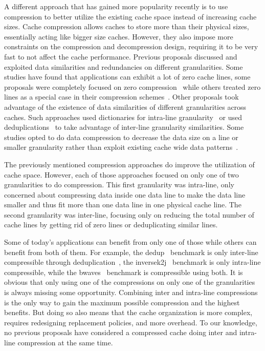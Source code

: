 A different approach that has gained more popularity recently is to use compression to better utilize the existing cache space instead of increasing cache sizes. Cache compression allows caches to store more than their physical sizes, essentially acting like bigger size caches. However, they also impose more constraints on the compression and decompression design, requiring it to be very fast to not affect the cache performance. Previous proposals discussed and exploited data similarities and redundancies on different granularities. Some studies have found that applications can exhibit a lot of zero cache lines, some proposals were completely focused on zero compression~\cite{zca} while others treated zero lines as a special case in their compression schemes~\cite{fpc, hycomp, dedup}. Other proposals took advantage of the existence of data similarities of different granularities across caches. Such approaches used dictionaries for intra-line granularity~\cite{cpack, dish} or used deduplications~\cite{dedup} to take advantage of inter-line granularity similarities. Some studies opted to do data compression to decrease the data size on a line or smaller granularity rather than exploit existing cache wide data patterns~\cite{bdi, sc2, hycomp}.\par
The previously mentioned compression approaches do improve the utilization of cache space. However, each of those approaches focused on only one of two granularities to do compression. This first granularity was intra-line, only concerned about compressing data inside one data line to make the data line smaller and thus fit more than one data line in one physical cache line. The second granularity was inter-line, focusing only on reducing the total number of cache lines by getting rid of zero lines or deduplicating similar lines.\par
Some of today's applications can benefit from only one of those while others can benefit from both of them. For example, the dedup~\cite{parsec} benchmark is only inter-line compressible through deduplication~\cite{dedup}, the inversek2j~\cite{axbench} benchmark is only intra-line compressible, while the bwaves~\cite{spec} benchmark is compressible using both. It is obvious that only using one of the compressions on only one of the granularities is always missing some opportunity. Combining inter and intra-line compressions is the only way to gain the maximum possible compression and the highest benefits. But doing so also means that the cache organization is more complex, requires redesigning replacement policies, and more overhead. To our knowledge, no previous proposals have considered a compressed cache doing inter and intra-line compression at the same time.\par
